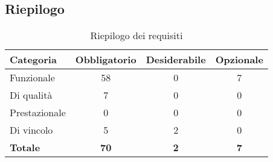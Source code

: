 \subsection{Riepilogo}
\begin{table}[h]
\begin{center}
\begin{tabular}{|l|c|c|c|}
\hline
\textbf{Categoria} & \textbf{Obbligatorio} & \textbf{Desiderabile} & \textbf{Opzionale} \\
\hline
Funzionale		&	58	&	0	&	7	\\
\hline
Di qualità		&	7	&	0	&	0	\\
\hline
Prestazionale	&	0	&	0	&	0	\\
\hline
Di vincolo		&	5	&	2	&	0	\\
\hline
\textbf{Totale} & \textbf{70} & \textbf{2} & \textbf{7} \\
\hline
\end{tabular}
\end{center}
\caption{Riepilogo dei requisiti}
\end{table}

